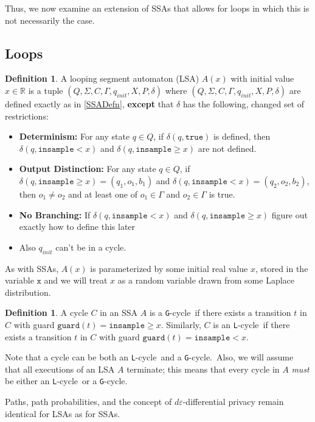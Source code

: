 \documentclass[12pt]{article}
\newcommand{\RR}{\mathbb{R}}
\newcommand{\gguard}[1][x]{\texttt{insample}\geq #1}
\newcommand{\lguard}[1][x]{\texttt{insample} < #1}
\newcommand{\guard}{\texttt{guard}}
\newcommand{\gcycle}{\texttt{G}-cycle}
\newcommand{\lcycle}{\texttt{L}-cycle}
\theoremstyle{definition}
\newtheorem{defn}[thm]{Definition}
\begin{document}
Thus, we now examine an extension of SSAs that allows for loops in which this is not necessarily the case. 

\subsection{Loops}
\begin{defn}\label{LSADefn}
    A looping segment automaton (LSA) $A(x)$ with initial value $x\in \RR$ is a tuple $(Q, \Sigma, C, \Gamma, q_{init}, X, P, \delta)$ where $(Q, \Sigma, C, \Gamma, q_{init}, X, P, \delta)$ are defined exactly as in \ref{SSADefn}, \textbf{except} that $\delta$ has the following, changed set of restrictions: \begin{itemize}  
        \item \textbf{Determinism:} For any state $q\in Q$, if $\delta(q,\texttt{true})$ is defined, then $\delta(q,\lguard)$ and $\delta(q,\gguard)$ are not defined. 

        \item \textbf{Output Distinction:} For any state $q\in Q$, if $\delta(q, \gguard) = (q_1, o_1, b_1)$ and $\delta(q, \lguard) = (q_2, o_2, b_2)$, then $o_1\neq o_2$ and at least one of $o_1\in \Gamma$ and $o_2\in \Gamma$ is true.
        \item \textbf{No Branching:} If $\delta(q, \lguard)$ and $\delta(q, \gguard)$ {\color{red}figure out exactly how to define this later}
        \item Also $q_{init}$ can't be in a cycle. 
    \end{itemize}

    As with SSAs, $A(x)$ is parameterized by some initial real value $x$, stored in the variable $\texttt{x}$ and we will treat $x$ as a random variable drawn from some Laplace distribution.
\end{defn}

\begin{defn}
    A cycle $C$ in an SSA $A$ is a \gcycle\ if there exists a transition $t$ in $C$ with guard $\guard(t) = \gguard$. Similarly, $C$ is an \lcycle\ if there exists a transition $t$ in $C$ with guard $\guard(t) = \lguard$.
\end{defn}

Note that a cycle can be both an \lcycle~and a \gcycle.\ Also, we will assume that all executions of an LSA $A$ terminate; this means that every cycle in $A$ \textit{must} be either an \lcycle~or a \gcycle.

Paths, path probabilities, and the concept of $d\varepsilon$-differential privacy remain identical for LSAs as for SSAs. 
\end{document}
